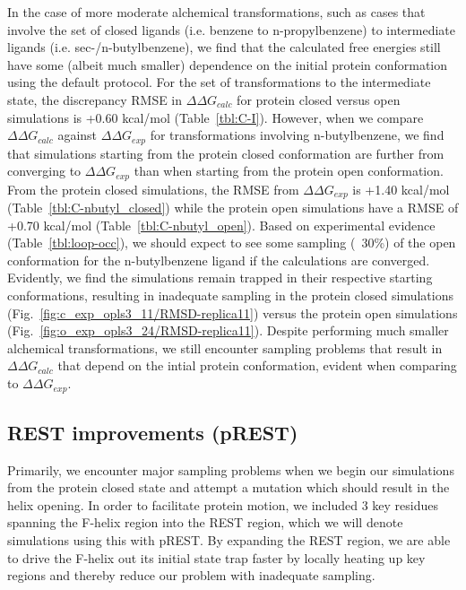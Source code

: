 \documentclass[journal=jctcce,manuscript=article]{achemso}
\begin{document}
In the case of more moderate alchemical transformations, such as cases that involve the set of closed ligands (i.e. benzene to n-propylbenzene) to intermediate ligands (i.e. sec-/n-butylbenzene), we find that the calculated free energies still have some (albeit much smaller) dependence on the initial protein conformation using the default protocol.
For the set of transformations to the intermediate state, the discrepancy RMSE in $\Delta\Delta G_{calc}$ for protein closed versus open simulations is +0.60 kcal/mol (Table~\ref{tbl:C-I}). 
However, when we compare $\Delta\Delta G_{calc}$ against $\Delta\Delta G_{exp}$ for transformations involving n-butylbenzene, we find that simulations starting from the protein closed conformation are further from converging to $\Delta\Delta G_{exp}$ than when starting from the protein open conformation.
From the protein closed simulations, the RMSE from $\Delta\Delta G_{exp}$ is +1.40 kcal/mol (Table~\ref{tbl:C-nbutyl_closed}) while the protein open simulations have a RMSE of +0.70 kcal/mol (Table~\ref{tbl:C-nbutyl_open}).
Based on experimental evidence (Table~\ref{tbl:loop-occ}), we should expect to see some sampling (~30\%) of the open conformation for the n-butylbenzene ligand if the calculations are converged.
Evidently, we find the simulations remain trapped in their respective starting conformations, resulting in inadequate sampling in the protein closed simulations (Fig.~\ref{fig:c_exp_opls3_11/RMSD-replica11}) versus the protein open simulations (Fig.~\ref{fig:o_exp_opls3_24/RMSD-replica11}).
Despite performing much smaller alchemical transformations, we still encounter sampling problems that result in $\Delta\Delta G_{calc}$ that depend on the intial protein conformation, evident when comparing to $\Delta\Delta G_{exp}$.

\subsection*{REST improvements (pREST)}
Primarily, we encounter major sampling problems when we begin our simulations from the protein closed state and attempt a mutation which should result in the helix opening.
In order to facilitate protein motion, we included 3 key residues spanning the F-helix region into the REST region, which we will denote simulations using this with pREST. %
By expanding the REST region, we are able to drive the F-helix out its initial state trap faster by locally heating up key regions and thereby reduce our problem with inadequate sampling.
\end{document}
